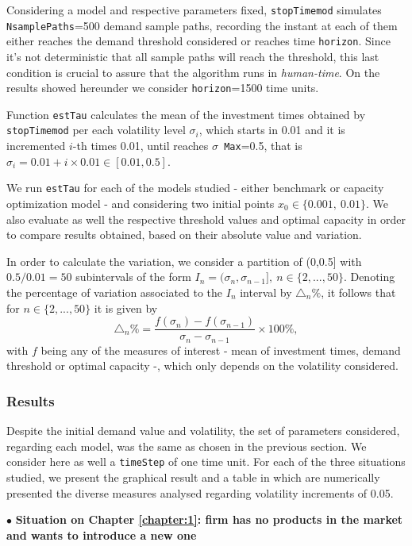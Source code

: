 Considering a model and respective parameters fixed, \texttt{stopTimemod} simulates \texttt{NsamplePaths}=500 demand sample paths, recording the instant at each of them either reaches the demand threshold considered or reaches time \texttt{horizon}. Since it's not deterministic that all sample paths will reach the threshold, this last condition is crucial to assure that the algorithm runs in \textit{human-time}. On the results showed hereunder we consider \texttt{horizon}=1500 time units.

Function \texttt{estTau} calculates the mean of the investment times obtained by \texttt{stopTimemod} per each volatility level $\sigma_i$, which starts in 0.01 and it is incremented $i$-th times 0.01, until reaches \texttt{$\sigma$ Max}=0.5, that is $\sigma_i=0.01+i \times 0.01 \in [0.01,0.5]$.

We run \texttt{estTau} for each of the models studied - either benchmark or capacity optimization model - and considering two initial points $x_0 \in \{0.001, \ 0.01 \}$. We also evaluate as well the respective threshold values and optimal capacity in order to compare results obtained, based on their absolute value and variation.

In order to calculate the variation, we consider a partition of (0,0.5] with $0.5/0.01=50$ subintervals of the form $I_n=(\sigma_n, \sigma_{n-1}],\ n \in \{2,...,50\}$. Denoting the percentage of variation associated to the $I_n$ interval by $\triangle_n \%$, it follows that for $n \in \{2,...,50\}$ it is given by
$$\triangle_n \% = \frac{f(\sigma_n)-f(\sigma_{n-1})}{\sigma_n-\sigma_{n-1}} \times 100 \%,$$
with $f$ being any of the measures of interest - mean of investment times, demand threshold or optimal capacity -, which only depends on the volatility considered.




\subsubsection{Results}

Despite the initial demand value and volatility, the set of parameters considered, regarding each model, was the same as chosen in the previous section. We consider here as well a \texttt{timeStep} of one time unit. For each of the three situations studied, we present the graphical result and a table in which are numerically presented the diverse measures analysed regarding volatility increments of 0.05.

$\bullet$ \textbf{Situation on Chapter \ref{chapter:1}: firm has no products in the market and wants to introduce a new one}

